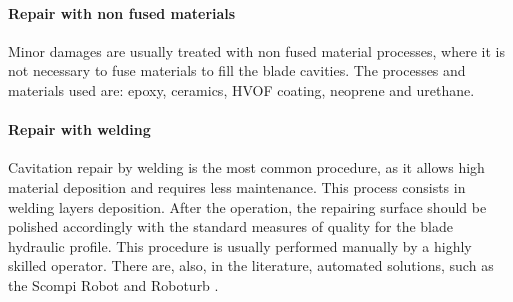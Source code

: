 \paragraph{Repair with non fused materials}

Minor damages are usually treated with non fused material processes, where it is
not necessary to fuse materials to fill the blade cavities. The processes and
materials used are: epoxy, ceramics, HVOF coating, neoprene and urethane.




\paragraph{Repair with welding}

Cavitation repair by welding is the most common procedure, as it allows high
material deposition and requires less maintenance. This process consists in
welding layers deposition. After the operation, the repairing surface should be
polished accordingly with the standard measures of quality for the blade
hydraulic profile. This procedure is usually performed manually by a highly
skilled operator. There are, also, in the literature, automated solutions, such
as the Scompi Robot and Roboturb \citep{roboturb,scompi}.

